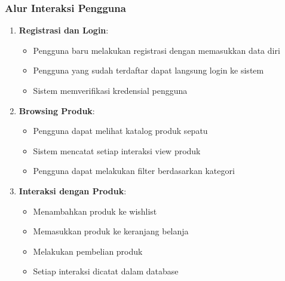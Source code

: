 \documentclass[journal,article,submit,pdftex,moreauthors]{Definitions/mdpi}
\begin{document}
\subsubsection{Alur Interaksi Pengguna}
\begin{enumerate}
    \item \textbf{Registrasi dan Login}:
    \begin{itemize}
        \item Pengguna baru melakukan registrasi dengan memasukkan data diri
        \item Pengguna yang sudah terdaftar dapat langsung login ke sistem
        \item Sistem memverifikasi kredensial pengguna
    \end{itemize}

    \item \textbf{Browsing Produk}:
    \begin{itemize}
        \item Pengguna dapat melihat katalog produk sepatu
        \item Sistem mencatat setiap interaksi view produk
        \item Pengguna dapat melakukan filter berdasarkan kategori
    \end{itemize}

    \item \textbf{Interaksi dengan Produk}:
    \begin{itemize}
        \item Menambahkan produk ke wishlist
        \item Memasukkan produk ke keranjang belanja
        \item Melakukan pembelian produk
        \item Setiap interaksi dicatat dalam database
    \end{itemize}
\end{enumerate}
\end{document}
